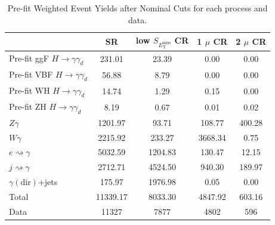 \begin{table}[htbp]
\centering
\caption{Pre-fit Weighted Event Yields after Nominal Cuts for each process and data.}
\renewcommand{\arraystretch}{1.2}
\begin{tabular}{l | c c c c}
\toprule
& SR & low $S_{E_{\text{T}}^{\text{miss}}}$ CR & 1 $\mu$ CR & 2 $\mu$ CR \\
\midrule
Pre-fit ggF $H \to \gamma\gamma_d$ & 231.01 & 23.39 & 0.00 & 0.00 \\
Pre-fit VBF $H \to \gamma\gamma_d$ & 56.88 & 8.79 & 0.00 & 0.00 \\
Pre-fit WH $H \to \gamma\gamma_d$ & 14.74 & 1.29 & 0.15 & 0.00 \\
Pre-fit ZH $H \to \gamma\gamma_d$ & 8.19 & 0.67 & 0.01 & 0.02 \\
\midrule
$Z\gamma$ & 1201.97 & 93.71 & 108.77 & 400.28 \\
$W\gamma$ & 2215.92 & 233.27 & 3668.34 & 0.75 \\
$e \rightsquigarrow \gamma$ & 5032.59 & 1204.83 & 130.47 & 12.15 \\
$j \rightsquigarrow \gamma$ & 2712.71 & 4524.50 & 940.30 & 189.97 \\
$\gamma(\text{dir})$+jets & 175.97 & 1976.98 & 0.05 & 0.00 \\
\midrule
Total & 11339.17 & 8033.30 & 4847.92 & 603.16 \\
\midrule
Data & 11327 & 7877 & 4802 & 596 \\
\bottomrule
\end{tabular}

\end{table}




